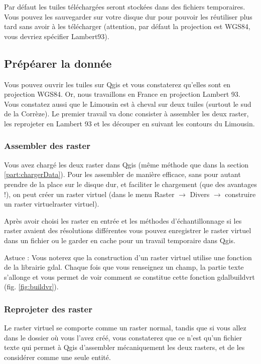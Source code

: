 \documentclass[a4paper, 11pt]{article}
\begin{document}
  Par défaut les tuiles téléchargées seront stockées dans des fichiers temporaires. Vous pouvez les sauvegarder sur votre disque dur pour pouvoir les réutiliser plus tard sans avoir à les télécharger (attention, par défaut la projection est WGS84, vous devriez spécifier Lambert93).

  \subsection{Prépéarer la donnée}

  Vous pouvez ouvrir les tuiles sur Qgis et vous constaterez qu'elles sont en projection WGS84. Or, nous travaillons en France en projection Lambert 93. Vous constatez aussi que le Limousin est à cheval sur deux tuiles (surtout le sud de la Corrèze). Le premier travail va donc consister à assembler les deux raster, les reprojeter en Lambert 93 et les découper en suivant les contours du Limousin.

    \subsubsection{Assembler des raster}

    Vous avez chargé les deux raster dans Qgis (même méthode que dans la section \ref{part:chargerData}). Pour les assembler de manière efficace, sans pour autant prendre de la place sur le disque dur, et faciliter le chargement (que des avantages !), on peut créer un raster virtuel (dans le menu Raster $\rightarrow$ Divers $\rightarrow$ construire un raster virtuelraster virtuel).

    Après avoir choisi les raster en entrée et les méthodes d'échantillonnage si les raster avaient des résolutions différentes vous pouvez enregistrer le raster virtuel dans un fichier ou le garder en cache pour un travail temporaire dans Qgis.

    Astuce : Vous noterez que la construction d'un raster virtuel utilise une fonction de la librairie gdal. Chaque fois que vous renseignez un champ, la partie texte s'allonge et vous permet de voir comment se constitue cette fonction gdalbuildvrt (fig. \ref{fig:buildvr}).

    \subsubsection{Reprojeter des raster}

    Le raster virtuel se comporte comme un raster normal, tandis que si vous allez dans le dossier où vous l'avez créé, vous constaterez que ce n'est qu'un fichier texte qui permet à Qgis d'assembler mécaniquement les deux rasters, et de les considérer comme une seule entité.
\end{document}
